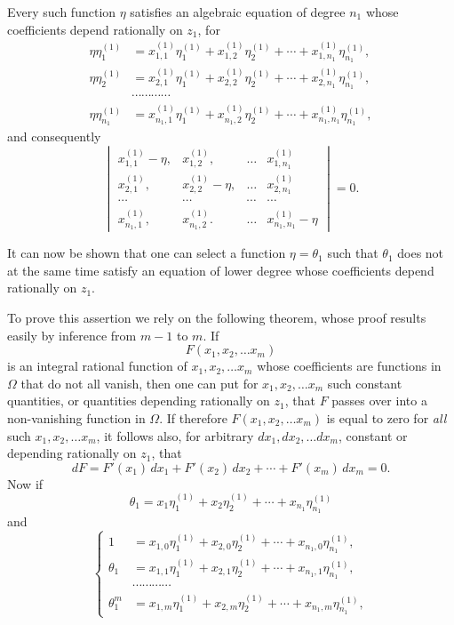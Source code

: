 \documentclass{article}
\begin{document}
Every such function $\eta$ satisfies an algebraic equation of degree $n_{1}$ whose coefficients depend rationally on $z_{1}$, for
\[ \begin{aligned} \eta\eta_{1}^{(1)} &= x_{1,1}^{(1)}\eta_{1}^{(1)} + x_{1,2}^{(1)}\eta_{2}^{(1)} + \cdots + x_{1,n_{1}}^{(1)}\eta_{n_{1}}^{(1)}, \\ \eta\eta_{2}^{(1)} &= x_{2,1}^{(1)}\eta_{1}^{(1)} + x_{2,2}^{(1)}\eta_{2}^{(1)} + \cdots + x_{2,n_{1}}^{(1)}\eta_{n_{1}}^{(1)}, \\ &\cdots\cdots\cdots\cdots \\ \eta\eta_{n_{1}}^{(1)} &= x_{n_{1},1}^{(1)}\eta_{1}^{(1)} + x_{n_{1},2}^{(1)}\eta_{2}^{(1)} + \cdots + x_{n_{1},n_{1}}^{(1)}\eta_{n_{1}}^{(1)}, \end{aligned} \]
and consequently
\[ \begin{vmatrix} x_{1,1}^{(1)} - \eta, & x_{1,2}^{(1)}, & \ldots & x_{1,n_{1}}^{(1)} \\ x_{2,1}^{(1)}, & x_{2,2}^{(1)} - \eta, & \ldots & x_{2,n_{1}}^{(1)} \\ \cdots & \cdots & \cdots & \cdots \\ x_{n_{1},1}^{(1)}, & x_{n_{1},2}^{(1)}. & \ldots & x_{n_{1},n_{1}}^{(1)} - \eta \end{vmatrix} = 0. \]

It can now be shown that one can select a function $\eta = \theta_{1}$ such that $\theta_{1}$ does not at the same time satisfy an equation of lower degree whose coefficients depend rationally on $z_{1}$.

To prove this assertion we rely on the following theorem, whose proof results easily by inference from $m-1$ to $m$. If
\[ F(x_{1}, x_{2}, \ldots x_{m}) \]
is an integral rational function of $x_{1}, x_{2}, \ldots x_{m}$ whose coefficients are functions in $\Omega$ that do not all vanish, then one can put for $x_{1}, x_{2}, \ldots x_{m}$ such constant quantities, or quantities depending rationally on $z_{1}$, that $F$ passes over into a non-vanishing function in $\Omega$. If therefore $F(x_{1}, x_{2}, \ldots x_{m})$ is equal to zero for \emph{all} such $x_{1}, x_{2}, \ldots x_{m}$, it follows also, for arbitrary $dx_{1}, dx_{2}, \ldots dx_{m}$, constant or depending rationally on $z_{1}$, that
\[ dF = F'(x_{1})\,dx_{1} + F'(x_{2})\,dx_{2} + \cdots + F'(x_{m})\,dx_{m} = 0. \]
Now if
\[ \theta_{1} = x_{1}\eta_{1}^{(1)} + x_{2}\eta_{2}^{(1)} + \cdots + x_{n_{1}}\eta_{n_{1}}^{(1)} \]
and
\[ \left\{ \begin{aligned} 1 &= x_{1,0}\eta_{1}^{(1)} + x_{2,0}\eta_{2}^{(1)} + \cdots + x_{n_{1},0}\eta_{n_{1}}^{(1)}, \\ \theta_{1} &= x_{1,1}\eta_{1}^{(1)} + x_{2,1}\eta_{2}^{(1)} + \cdots + x_{n_{1},1}\eta_{n_{1}}^{(1)}, \\ &\cdots\cdots\cdots\cdots \\ \theta_{1}^{m} &= x_{1,m}\eta_{1}^{(1)} + x_{2,m}\eta_{2}^{(1)} + \cdots + x_{n_{1},m}\eta_{n_{1}}^{(1)}, \end{aligned} \right. \tag{5.} \]
\end{document}
